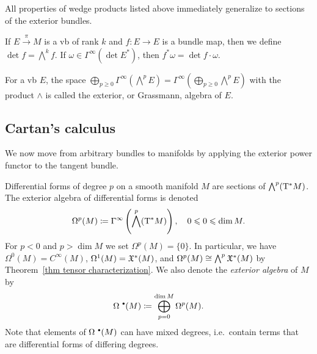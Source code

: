 All properties of wedge products listed above immediately generalize to sections of the exterior bundles.

\begin{defn}
If $E\overset\pi\to M$ is a \gls{vb} of rank $k$ and $f:E\to E$ is a bundle map, then we define $\det f=\bigwedge^k f$. If $\omega\in\Gamma^\infty(\det E^\ast)$, then $f^\ast \omega=\det f\cdot \omega$.
\end{defn}

\begin{defn}
For a \gls{vb} $E$, the space $\bigoplus_{p\geq 0}\Gamma^\infty(\bigwedge^p E)=\Gamma^\infty\left(\bigoplus_{p\geq 0}\bigwedge^p E\right)$ with the product $\wedge$ is called the exterior, or Grassmann, algebra of $E$.
\end{defn}







\subsection{Cartan's calculus}

We now move from arbitrary bundles to manifolds by applying the exterior power functor to the tangent bundle.

\begin{defn}
    Differential forms of degree $p$ on a smooth manifold $M$ are sections of $\bigwedge^p (\mathrm{T}^\ast M)$. The exterior algebra of differential forms is denoted
    \[\Omega^p(M)\coloneqq \Gamma^\infty\left(\bigwedge^p(\mathrm{T}^\ast M)\right),\quad 0\leqslant 0\leqslant\dim M.\]
    For $p<0$ and $p>\dim M$ we set $\Omega^p(M)=\{0\}$.
    In particular, we have $\Omega^0(M)=C^\infty(M)$, $\Omega^1(M)=\mathfrak{X}^\ast (M)$, and $\Omega^p(M)\cong \bigwedge^p \mathfrak{X}^\ast(M)$ by Theorem~\ref{thm tensor characterization}. We also denote the \emph{exterior algebra} of $M$ by
    \[\Omega^{\smbullet}(M)\coloneq\bigoplus_{p=0}^{\dim M} \Omega^p(M).\]
    Note that elements of $\Omega^{\smbullet}(M)$ can have mixed degrees, i.e.\ contain terms that are differential forms of differing degrees.
\end{defn}


